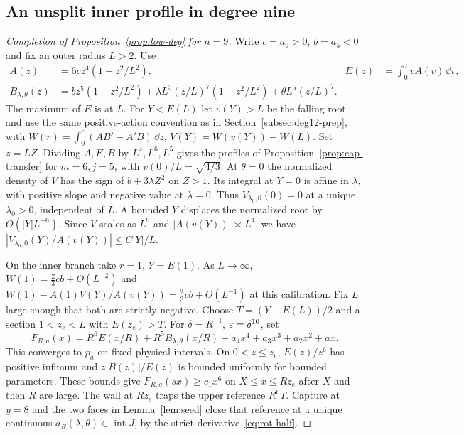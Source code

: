 \subsection{An unsplit inner profile in degree nine}\label{subsec:deg9}
\begin{proof}[Completion of Proposition~\ref{prop:low-deg} for $n=9$]
Write $c=a_6>0$, $b=a_5<0$ and fix an outer radius $L>2$. Use
\[
 \begin{aligned}
 A(z)&=6c z^4(1-z^2/L^2),& E(z)&=\int_0^z v A(v)\,\dd v,\\
 B_{\lambda,\theta}(z)&=b z^5(1-z^2/L^2)
     +\lambda L^5(z/L)^7(1-z^2/L^2)+\theta L^5(z/L)^7 .
 \end{aligned}
\]
The maximum of $E$ is at $L$. For $Y<E(L)$ let $v(Y)>L$ be the
falling root and use the same positive-action convention as in
Section~\ref{subsec:deg12-prep}, with $W(r)=\int_0^r(AB'-A'B)\,\dd z$,
$V(Y)=W(v(Y))-W(L)$. Set $z=LZ$. Dividing $A,E,B$ by
$L^4,L^6,L^5$ gives the profiles of Proposition~\ref{prop:cap-transfer}
for $m=6,j=5$, with $v(0)/L=\sqrt{4/3}$. At $\theta=0$ the
normalized density of $V$ has the sign of $b+3\lambda Z^2$ on
$Z>1$. Its integral at $Y=0$ is affine in $\lambda$, with positive
slope and negative value at $\lambda=0$. Thus $V_{\lambda_0,0}(0)=0$
at a unique $\lambda_0>0$, independent of $L$. A bounded $Y$ displaces
the normalized root by $O(|Y|L^{-6})$. Since $V$ scales as $L^9$ and
$|A(v(Y))|\asymp L^4$, we have
$|V_{\lambda_0,0}(Y)/A(v(Y))|\le C|Y|/L$.

On the inner branch take $r=1$, $Y=E(1)$. As $L\to\infty$,
$W(1)=\frac23 cb+O(L^{-2})$ and
$W(1)-A(1)V(Y)/A(v(Y))=\frac23 cb+O(L^{-1})$ at this calibration.
Fix $L$ large enough that both are strictly negative.
Choose $T=(Y+E(L))/2$ and a section $1<z_e<L$ with $E(z_e)>T$.
For $\delta=R^{-1}$, $\varepsilon=\delta^{10}$, set
\[
 F_{R,a}(x)=R^6 E(x/R)+R^5 B_{\lambda,\theta}(x/R)
                  +a_4x^4+a_3x^3+a_2x^2+ax .
\]
This converges to $p_a$ on fixed physical intervals. On $0<z\le z_e$,
$E(z)/z^6$ has positive infimum and $z|B(z)|/E(z)$ is bounded
uniformly for bounded parameters. These bounds give $F_{R,a}(sx)\ge c_1x^6$
on $X\le x\le Rz_e$ after $X$ and then $R$ are large.
The wall at $Rz_e$ traps the upper reference $R^6T$.
Capture at $y=8$ and the two faces in Lemma~\ref{lem:seed} close that
reference at a unique continuous $a_R(\lambda,\theta)\in\operatorname{int}J$,
by the strict derivative~\eqref{eq:rot-half}.


\end{proof}
